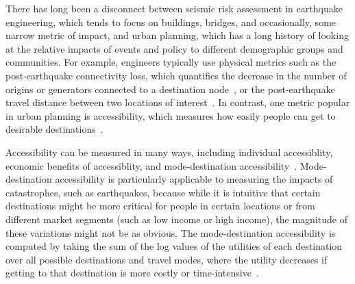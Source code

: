 There has long been a disconnect between seismic risk assessment in earthquake engineering, which tends to focus on buildings, bridges, and occasionally, some narrow metric of impact, and urban planning, which has a long history of looking at the relative impacts of events and policy to different demographic groups and communities. For example, engineers typically use physical metrics such as the post-earthquake connectivity loss, which quantifies the decrease in the number of origins or generators connected to a destination node~\cite[e.g.,][]{duenas-osorio_seismic_2007}, or the post-earthquake travel distance between two locations of interest~\cite[e.g.,][]{chang_probabilistic_2000}. In contrast, one metric popular in urban planning is accessibility, which measures how easily people can get to desirable destinations~\cite{niemeier_accessibility:_1997}.

Accessibility can be measured in many ways, including individual accessiblity, economic benefits of accessiblity, and mode-destination accessibility~\cite{geurs_accessibility_2004}. Mode-destination accessibility is particularly applicable to measuring the impacts of catastrophes, such as earthquakes, because while it is intuitive that certain destinations might be more critical for people in certain locations or from different market segments (such as low income or high income), the magnitude of these variations might not be as obvious. The mode-destination accessibility is computed by taking the sum of the log values of the utilities of each destination over all possible destinations and travel modes, where the utility decreases if getting to that destination is more costly or time-intensive~\cite{handy_measuring_1997}.

